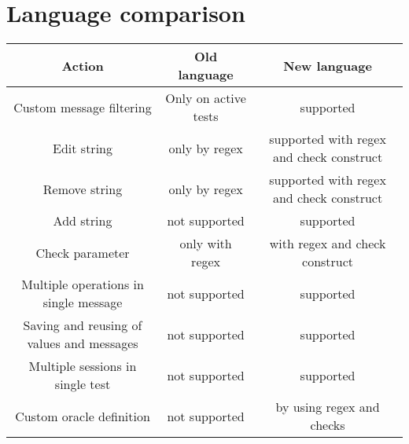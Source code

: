 \chapter{Language comparison}
\label{attachment:languages_comparison}

\begin{center}
    \begin{tabular}{ |c|c|c| }
        \hline
        Action                                    & Old language         & New language                             \\
        \hline\hline
        Custom message filtering                  & Only on active tests & supported                                \\
        Edit string                               & only by regex        & supported with regex and check construct \\
        Remove string                             & only by regex        & supported with regex and check construct \\
        Add string                                & not supported        & supported                                \\
        Check parameter                           & only with regex      & with regex and check construct           \\
        Multiple operations in single message     & not supported        & supported                                \\
        Saving and reusing of values and messages & not supported        & supported                                \\
        Multiple sessions in single test          & not supported        & supported                                \\
        Custom oracle definition                  & not supported        & by using regex and checks                \\
        \hline
    \end{tabular}
\end{center}


